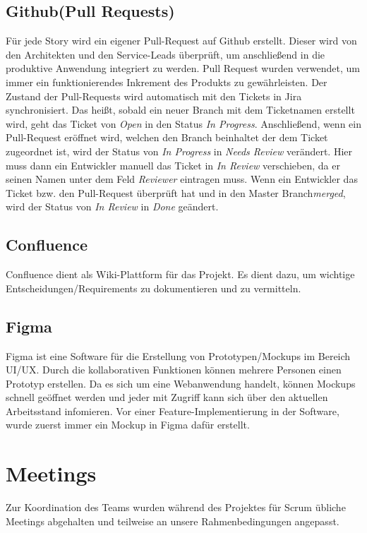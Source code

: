\subsection{Github(Pull Requests)}
    Für jede Story wird ein eigener Pull-Request auf Github erstellt. Dieser wird von den Architekten und den Service-Leads überprüft, um anschließend in die
    produktive Anwendung integriert zu werden. Pull Request wurden verwendet, um immer ein funktionierendes Inkrement des Produkts zu gewährleisten.
    Der Zustand der Pull-Requests wird automatisch mit den Tickets in Jira synchronisiert. Das heißt, sobald ein neuer Branch mit dem Ticketnamen erstellt wird,
    geht das Ticket von \textit{Open} in den Status \textit{In Progress}. Anschließend, wenn ein Pull-Request eröffnet wird, welchen den Branch beinhaltet der dem Ticket zugeordnet ist,
    wird der Status von \textit{In Progress} in \textit{Needs Review} verändert. Hier muss dann ein Entwickler manuell das Ticket in \textit{In Review} verschieben, da er seinen Namen unter dem Feld \textit{Reviewer}
    eintragen muss. Wenn ein Entwickler das Ticket bzw. den Pull-Request überprüft hat und in den Master Branch\textit{merged}, wird der Status von \textit{In Review} in \textit{Done} geändert.
\subsection{Confluence}
    Confluence dient als Wiki-Plattform für das Projekt. Es dient dazu, um wichtige Entscheidungen/Requirements zu dokumentieren und zu vermitteln.
\subsection{Figma}
    Figma ist eine Software für die Erstellung von Prototypen/Mockups im Bereich UI/UX. Durch die kollaborativen Funktionen können mehrere Personen einen Prototyp erstellen.
    Da es sich um eine Webanwendung handelt, können Mockups schnell geöffnet werden und jeder mit Zugriff kann sich über den aktuellen Arbeitsstand infomieren.
    Vor einer Feature-Implementierung in der Software, wurde zuerst immer ein Mockup in Figma dafür erstellt.

\section{Meetings}
Zur Koordination des Teams wurden während des Projektes für Scrum übliche Meetings abgehalten und teilweise an unsere Rahmenbedingungen angepasst.

